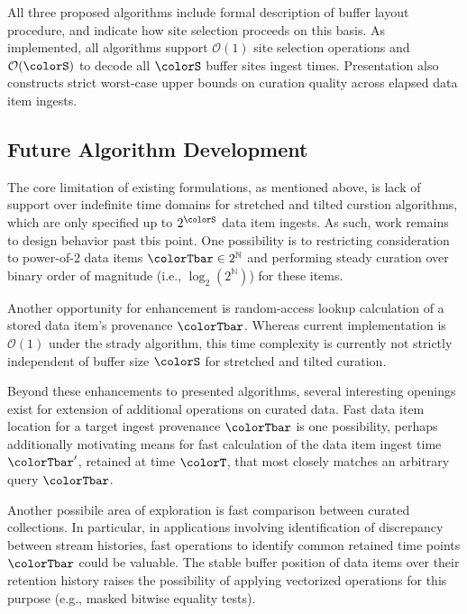 All three proposed algorithms include formal description of buffer layout procedure, and indicate how site selection proceeds on this basis.
As implemented, all algorithms support $\mathcal{O}(1)$ site selection operations and $\mathcal{O}(\colorS)$ to decode all $\colorS$ buffer sites ingest times.
Presentation also constructs strict worst-case upper bounds on curation quality across elapsed data item ingests.

\subsection{Future Algorithm Development}

The core limitation of existing formulations, as mentioned above, is lack of support over indefinite time domains for stretched and tilted curstion algorithms, which are only specified up to $2^{\colorS}$ data item ingests.
As such, work remains to design behavior past tbis point.
One possibility is to restricting consideration to power-of-2 data items $\colorTbar \in 2^{\mathbb{N}}$ and performing steady curation over binary order of magnitude (i.e., $\log_2(2^{\mathbb{N}})$) for these items.

Another opportunity for enhancement is random-access lookup calculation of a stored data item's provenance $\colorTbar$.
Whereas current implementation is $\mathcal{O}(1)$ under the strady algorithm, this time complexity is currently not strictly independent of buffer size $\colorS$ for stretched and tilted curation.

Beyond these enhancements to presented algorithms, several interesting openings exist for extension of additional operations on curated data.
Fast data item location for a target ingest provenance $\colorTbar$ is one possibility, perhaps additionally motivating means for fast calculation of the data item ingest time $\colorTbar'$, retained at time $\colorT$, that most closely matches an arbitrary query $\colorTbar$.

Another possibile area of exploration is fast comparison between curated collections.
In particular, in applications involving identification of discrepancy between stream histories, fast operations to identify common retained time points $\colorTbar$ could be valuable.
The stable buffer position of data items over their retention history raises the possibility of applying vectorized operations for this purpose (e.g., masked bitwise equality tests).


